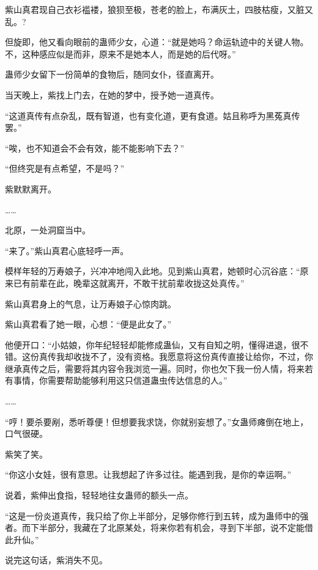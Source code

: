 
\begin{this_body}



紫山真君现自己衣衫褴褛，狼狈至极，苍老的脸上，布满灰土，四肢枯瘦，又脏又乱。?

但旋即，他又看向眼前的蛊师少女，心道：“就是她吗？命运轨迹中的关键人物。不，这种感应似是而非，原来不是她本人，而是她的后代呀。”

蛊师少女留下一份简单的食物后，随同女仆，径直离开。

当天晚上，紫找上门去，在她的梦中，授予她一道真传。

“这道真传有点杂乱，既有智道，也有变化道，更有食道。姑且称呼为黑菟真传罢。”

“唉，也不知道会不会有效，能不能影响下去？”

“但终究是有点希望，不是吗？”

紫默默离开。

……

北原，一处洞窟当中。

“来了。”紫山真君心底轻呼一声。

模样年轻的万寿娘子，兴冲冲地闯入此地。见到紫山真君，她顿时心沉谷底：“原来已有前辈在此，晚辈这就离开，不敢干扰前辈收拢这处真传。”

紫山真君身上的气息，让万寿娘子心惊肉跳。

紫山真君看了她一眼，心想：“便是此女了。”

他便开口：“小姑娘，你年纪轻轻却能修成蛊仙，又有自知之明，懂得进退，很不错。这份真传我却收拢不了，没有资格。我愿意将这份真传直接让给你，不过，你继承真传之后，需要将其内容令我浏览一遍。同时，你也欠下我一份人情，将来若有事情，你需要帮助能够利用这只信道蛊虫传达信息的人。”

……

“哼！要杀要剐，悉听尊便！但想要我求饶，你就别妄想了。”女蛊师瘫倒在地上，口气很硬。

紫笑了笑。

“你这小女娃，很有意思。让我想起了许多过往。能遇到我，是你的幸运啊。”

说着，紫伸出食指，轻轻地往女蛊师的额头一点。

“这是一份炎道真传，我只给了你上半部分，足够你修行到五转，成为蛊师中的强者。而下半部分，我藏在了北原某处，将来你若有机会，寻到下半部，说不定能借此升仙。”

说完这句话，紫消失不见。


\end{this_body}
